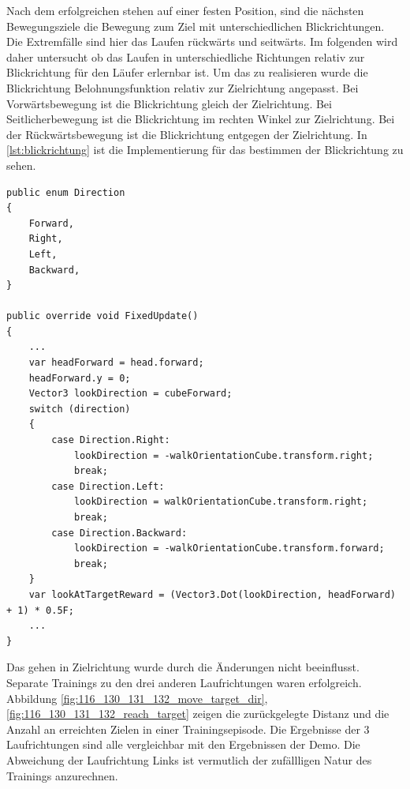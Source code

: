 Nach dem erfolgreichen stehen auf einer festen Position, sind die nächsten Bewegungsziele die Bewegung zum Ziel mit unterschiedlichen Blickrichtungen. Die Extremfälle sind hier das Laufen rückwärts und seitwärts.
Im folgenden wird daher untersucht ob das Laufen in unterschiedliche Richtungen relativ zur Blickrichtung für den Läufer erlernbar ist. Um das zu realisieren wurde die Blickrichtung Belohnungsfunktion relativ zur Zielrichtung angepasst. Bei Vorwärtsbewegung ist die Blickrichtung gleich der Zielrichtung. Bei Seitlicherbewegung ist die Blickrichtung im rechten Winkel zur Zielrichtung. Bei der Rückwärtsbewegung ist die Blickrichtung entgegen der Zielrichtung. In \ref{lst:blickrichtung} ist die Implementierung für das bestimmen der Blickrichtung zu sehen.

\begin{lstlisting}[caption={Blickrichtung Enum und Belohnung},captionpos=b,label={lst:blickrichtung}]
public enum Direction
{
    Forward,
    Right,
    Left,
    Backward,
}
    
public override void FixedUpdate()
{
    ...
    var headForward = head.forward;
    headForward.y = 0;
    Vector3 lookDirection = cubeForward;
    switch (direction)
    {
        case Direction.Right:
            lookDirection = -walkOrientationCube.transform.right;
            break;
        case Direction.Left:
            lookDirection = walkOrientationCube.transform.right;
            break;
        case Direction.Backward:
            lookDirection = -walkOrientationCube.transform.forward;
            break;
    }
    var lookAtTargetReward = (Vector3.Dot(lookDirection, headForward) + 1) * 0.5F;
    ...
}
\end{lstlisting}

Das gehen in Zielrichtung wurde durch die Änderungen nicht beeinflusst. Separate Trainings zu den drei anderen Laufrichtungen waren erfolgreich. Abbildung \ref{fig:116_130_131_132_move_target_dir}, \ref{fig:116_130_131_132_reach_target} zeigen die zurückgelegte Distanz und die Anzahl an erreichten Zielen in einer Trainingsepisode. Die Ergebnisse der 3 Laufrichtungen sind alle vergleichbar mit den Ergebnissen der Demo. Die Abweichung der Laufrichtung Links ist vermutlich der zufällligen Natur des Trainings anzurechnen.

